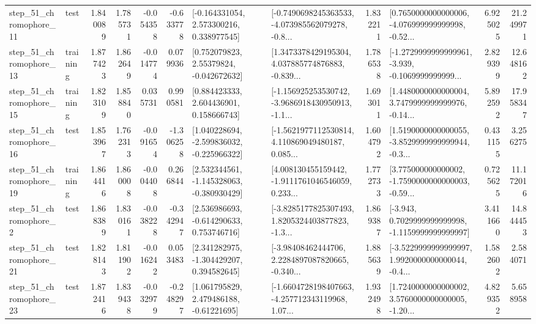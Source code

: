 \begin{tabular}{llrrrrllrlrr}
   step\_51\_chromophore\_11 &      test &      1.840089 &    1.785731 &     -0.054358 & -0.633778 &    [-0.164331054, 2.573300216, 0.338977545] &  [-0.7490698245363533, -4.073985562079278, -0.8... &       1.832211 &  [0.7650000000000006, -4.076999999999998, -0.52... &            6.925025 &         21.249971 \\
   step\_51\_chromophore\_13 &  training &      1.877423 &    1.862649 &     -0.014774 &  0.079936 &     [0.752079823, 2.55379824, -0.042672632] &  [1.3473378429195304, 4.037885774876883, -0.839... &       1.786538 &  [-1.2729999999999961, -3.939, -0.1069999999999... &            2.829399 &         12.648162 \\
   step\_51\_chromophore\_15 &  training &      1.823109 &    1.858840 &      0.035731 &  0.990581 &     [0.884423333, 2.604436901, 0.158666743] &  [-1.156925253530742, -3.9686918430950913, -1.1... &       1.693011 &  [1.4480000000000004, 3.7479999999999976, -0.14... &            5.892592 &         17.958347 \\
   step\_51\_chromophore\_16 &      test &      1.853967 &    1.762313 &     -0.091654 & -1.306258 &   [1.040228694, -2.599836032, -0.225966322] &  [-1.5621977112530814, 4.110869049480187, 0.085... &       1.604792 &  [1.5190000000000055, -3.8529999999999944, -0.3... &            0.431155 &          3.256275 \\
   step\_51\_chromophore\_19 &  training &      1.864416 &    1.860008 &     -0.004408 &  0.266844 &   [2.532344561, -1.145328063, -0.380930429] &  [4.008130455159442, -1.9111761046546059, 0.233... &       1.772733 &  [3.775000000000002, -1.7590000000000003, -0.59... &            0.725625 &         11.172016 \\
    step\_51\_chromophore\_2 &      test &      1.868389 &    1.830161 &     -0.038228 & -0.342947 &    [2.536986693, -0.614290633, 0.753746716] &  [-3.8285177825307493, 1.8205324403877823, -1.3... &       1.869387 &  [-3.943, 0.7029999999999998, -1.1159999999999997] &            3.411660 &         14.844453 \\
   step\_51\_chromophore\_21 &      test &      1.828143 &    1.811902 &     -0.016242 &  0.053483 &    [2.341282975, -1.304429207, 0.394582645] &  [-3.98408462444706, 2.2284897087820665, -0.340... &       1.885639 &  [-3.5229999999999997, 1.9920000000000044, -0.4... &            1.582602 &          2.584071 \\
   step\_51\_chromophore\_23 &      test &      1.872416 &    1.839438 &     -0.032979 & -0.248297 &     [1.061795829, 2.479486188, -0.61221695] &  [-1.6604728198407663, -4.257712343119968, 1.07... &       1.932498 &  [1.7240000000000002, 3.5760000000000005, -1.20... &            4.829352 &          5.658958 \\

\end{tabular}
